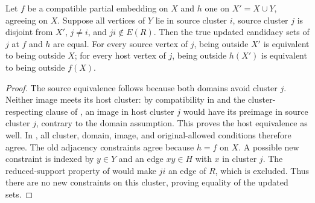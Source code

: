 \begin{lemma}
Let $f$ be a compatible partial embedding on $X$ and $h$ one on
$X'=X\cup Y$, agreeing on $X$. Suppose all vertices of $Y$ lie in source
cluster $i$, source cluster $j$ is disjoint from $X'$, $j\ne i$, and
$ji\notin E(R)$. Then the true updated candidacy sets of $j$ at $f$
and $h$ are equal. For every source vertex of $j$, being outside $X'$
is equivalent to being outside $X$; for every host vertex of $j$, being
outside $h(X')$ is equivalent to being outside $f(X)$.
\end{lemma}
\begin{proof}
The source equivalence follows because both domains avoid cluster $j$.
Neither image meets its host cluster: by compatibility in
 and the cluster-respecting clause
of , an image in host cluster $j$ would have
its preimage in source cluster $j$, contrary to the domain assumption.
This proves the host equivalence as well.
In , all cluster, domain, image, and
original-allowed conditions therefore agree. The old adjacency
constraints agree because $h=f$ on $X$. A possible new constraint is
indexed by $y\in Y$ and an edge $xy\in H$ with $x$ in cluster $j$.
The reduced-support property of  would make
$ji$ an edge of $R$, which is excluded. Thus there are no new
constraints on this cluster, proving equality of the updated sets.
\end{proof}
